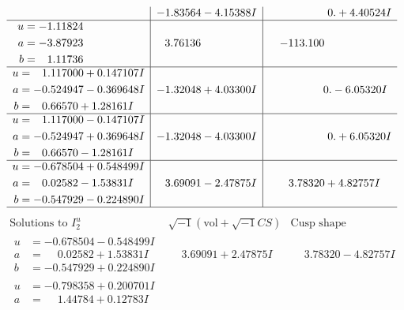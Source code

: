 \documentclass[1p]{elsarticle_modified}
\theoremstyle{definition}
\newcommand{\I}{\sqrt{-1}}
\begin{document}
$$\begin{array}{c|c|c}
 & -1.83564 - 4.15388 I & \phantom{-0.000000 -}0. + 4.40524 I \\ \hline\begin{aligned}
u &= -1.11824\phantom{ +0.000000I} \\
a &= -3.87923\phantom{ +0.000000I} \\
b &= \phantom{-}1.11736\phantom{ +0.000000I}\end{aligned}
 & \phantom{-}3.76136\phantom{ +0.000000I} & -113.100\phantom{ +0.000000I} \\ \hline\begin{aligned}
u &= \phantom{-}1.117000 + 0.147107 I \\
a &= -0.524947 - 0.369648 I \\
b &= \phantom{-}0.66570 + 1.28161 I\end{aligned}
 & -1.32048 + 4.03300 I & \phantom{-0.000000 } 0. - 6.05320 I \\ \hline\begin{aligned}
u &= \phantom{-}1.117000 - 0.147107 I \\
a &= -0.524947 + 0.369648 I \\
b &= \phantom{-}0.66570 - 1.28161 I\end{aligned}
 & -1.32048 - 4.03300 I & \phantom{-0.000000 -}0. + 6.05320 I \\ \hline\begin{aligned}
u &= -0.678504 + 0.548499 I \\
a &= \phantom{-}0.02582 - 1.53831 I \\
b &= -0.547929 - 0.224890 I\end{aligned}
 & \phantom{-}3.69091 - 2.47875 I & \phantom{-}3.78320 + 4.82757 I\\
 \hline 
 \end{array}$$\newpage$$\begin{array}{c|c|c}  
\text{Solutions to }I^u_{2}& \I (\text{vol} + \sqrt{-1}CS) & \text{Cusp shape}\\
 \hline 
\begin{aligned}
u &= -0.678504 - 0.548499 I \\
a &= \phantom{-}0.02582 + 1.53831 I \\
b &= -0.547929 + 0.224890 I\end{aligned}
 & \phantom{-}3.69091 + 2.47875 I & \phantom{-}3.78320 - 4.82757 I \\ \hline\begin{aligned}
u &= -0.798358 + 0.200701 I \\
a &= \phantom{-}1.44784 + 0.12783 I \\

\end{aligned}
\end{array}$$
\end{document}

